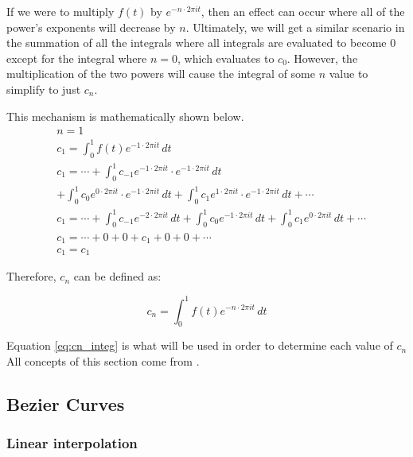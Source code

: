 \documentclass[letterpaper, 12pt]{article}
\begin{document}
If we were to multiply \(f(t)\) by \(e^{-n \cdot 2\pi it}\), then an effect can occur
where all of the power's exponents will decrease by \(n\). Ultimately, we will
get a similar scenario in the summation of all the integrals where
all integrals are evaluated to become 0 except for the integral
where \(n = 0\), which evaluates to \(c_0\). However, the multiplication
of the two powers will cause the integral of some \(n\) value to simplify to just
\(c_n\).

This mechanism is mathematically shown below.
\begin{align*}
     & n = 1
    \\
     & c_1 = \int_{0}^{1} f(t) e^{-1 \cdot 2\pi it} \,dt
    \\
     & c_1 = \cdots + \int_{0}^{1} c_{-1} e^{-1 \cdot 2\pi it} \cdot e^{-1 \cdot 2\pi it} \,dt
    \\
     & + \int_{0}^{1} c_{0} e^{0 \cdot 2\pi it} \cdot e^{-1 \cdot 2\pi it} \,dt + \int_{0}^{1} c_{1} e^{1 \cdot 2\pi it} \cdot e^{-1 \cdot 2\pi it} \,dt + \cdots
    \\
     & c_1 = \cdots + \int_{0}^{1} c_{-1} e^{-2 \cdot 2\pi it} \,dt + \int_{0}^{1} c_{0} e^{-1 \cdot 2\pi it} \,dt + \int_{0}^{1} c_{1} e^{0 \cdot 2\pi it} \,dt + \cdots
    \\
     & c_1 = \cdots + 0 + 0 + c_1 + 0 + 0 + \cdots
    \\
     & c_1 = c_1
\end{align*}

Therefore, \(c_n\) can be defined as:

\begin{equation}
    c_n = \int_{0}^{1} f(t) e^{-n \cdot 2\pi it} \,dt
    \label{eq:cn_integ}
\end{equation}

Equation \ref*{eq:cn_integ} is what will be used in order to
determine each value of \(c_n\)
\\

All concepts of this section come from \cite{sandersonWhatFourierSeries2019}.


\subsection{Bezier Curves}

\subsubsection{Linear interpolation}
\end{document}

